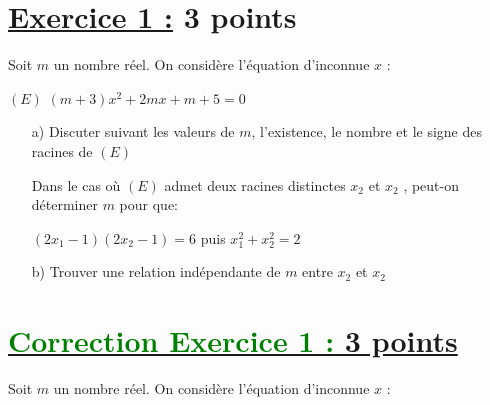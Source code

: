 \documentclass[12pt,a4paper]{article}
\begin{document}
\renewcommand{\arraystretch}{1.5}
\renewcommand{\arrayrulewidth}{1.2pt}
\vspace{3cm}

\section*{\underline{Exercice 1 :} 3 points}
Soit \( m \) un nombre réel. On considère l’équation d’inconnue \( x \) :

\( (E) \) \( (m+3)x^{2} +2mx + m + 5 = 0\)
\begin{enumerate}

\item[a)] Discuter suivant les valeurs de \( m \), l’existence, le nombre et le signe des racines de \( (E) \) 

Dans le cas où \( (E) \) admet deux racines distinctes \( x_{2} \) et \( x_{2} \) , peut-on déterminer \( m \) pour que:

\( ( 2x_{1} - 1 ) (2x_{2}-1) = 6 \) puis \( x_{1}^{2} + x_{2}^{2} = 2 \)

\item[b)]Trouver une relation indépendante de \( m \) entre \( x_{2} \) et \( x_{2} \)
\end{enumerate}
\section*{\underline{\textcolor{green}{Correction Exercice 1 :} 3 points}}
Soit \( m \) un nombre réel. On considère l’équation d’inconnue \( x \) :
\end{document}

